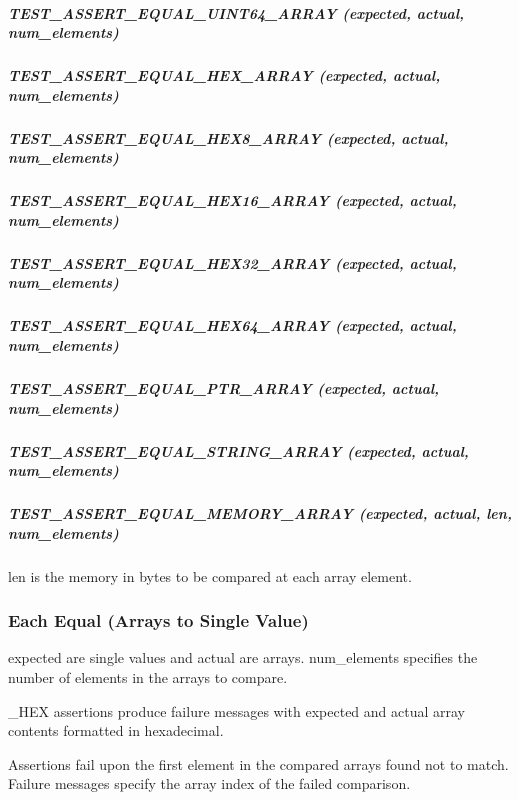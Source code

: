 \subparagraph*{{\ttfamily T\+E\+S\+T\+\_\+\+A\+S\+S\+E\+R\+T\+\_\+\+E\+Q\+U\+A\+L\+\_\+\+U\+I\+N\+T64\+\_\+\+A\+R\+R\+AY (expected, actual, num\+\_\+elements)}}

\subparagraph*{{\ttfamily T\+E\+S\+T\+\_\+\+A\+S\+S\+E\+R\+T\+\_\+\+E\+Q\+U\+A\+L\+\_\+\+H\+E\+X\+\_\+\+A\+R\+R\+AY (expected, actual, num\+\_\+elements)}}

\subparagraph*{{\ttfamily T\+E\+S\+T\+\_\+\+A\+S\+S\+E\+R\+T\+\_\+\+E\+Q\+U\+A\+L\+\_\+\+H\+E\+X8\+\_\+\+A\+R\+R\+AY (expected, actual, num\+\_\+elements)}}

\subparagraph*{{\ttfamily T\+E\+S\+T\+\_\+\+A\+S\+S\+E\+R\+T\+\_\+\+E\+Q\+U\+A\+L\+\_\+\+H\+E\+X16\+\_\+\+A\+R\+R\+AY (expected, actual, num\+\_\+elements)}}

\subparagraph*{{\ttfamily T\+E\+S\+T\+\_\+\+A\+S\+S\+E\+R\+T\+\_\+\+E\+Q\+U\+A\+L\+\_\+\+H\+E\+X32\+\_\+\+A\+R\+R\+AY (expected, actual, num\+\_\+elements)}}

\subparagraph*{{\ttfamily T\+E\+S\+T\+\_\+\+A\+S\+S\+E\+R\+T\+\_\+\+E\+Q\+U\+A\+L\+\_\+\+H\+E\+X64\+\_\+\+A\+R\+R\+AY (expected, actual, num\+\_\+elements)}}

\subparagraph*{{\ttfamily T\+E\+S\+T\+\_\+\+A\+S\+S\+E\+R\+T\+\_\+\+E\+Q\+U\+A\+L\+\_\+\+P\+T\+R\+\_\+\+A\+R\+R\+AY (expected, actual, num\+\_\+elements)}}

\subparagraph*{{\ttfamily T\+E\+S\+T\+\_\+\+A\+S\+S\+E\+R\+T\+\_\+\+E\+Q\+U\+A\+L\+\_\+\+S\+T\+R\+I\+N\+G\+\_\+\+A\+R\+R\+AY (expected, actual, num\+\_\+elements)}}

\subparagraph*{{\ttfamily T\+E\+S\+T\+\_\+\+A\+S\+S\+E\+R\+T\+\_\+\+E\+Q\+U\+A\+L\+\_\+\+M\+E\+M\+O\+R\+Y\+\_\+\+A\+R\+R\+AY (expected, actual, len, num\+\_\+elements)}}

{\ttfamily len} is the memory in bytes to be compared at each array element.

\subsubsection*{Each Equal (Arrays to Single Value)}

{\ttfamily expected} are single values and {\ttfamily actual} are arrays. {\ttfamily num\+\_\+elements} specifies the number of elements in the arrays to compare.

{\ttfamily \+\_\+\+H\+EX} assertions produce failure messages with expected and actual array contents formatted in hexadecimal.

Assertions fail upon the first element in the compared arrays found not to match. Failure messages specify the array index of the failed comparison.


